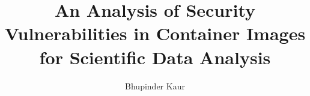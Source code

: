 \author{Bhupinder Kaur}
\title{An Analysis of Security Vulnerabilities in Container
Images for Scientific Data Analysis}


